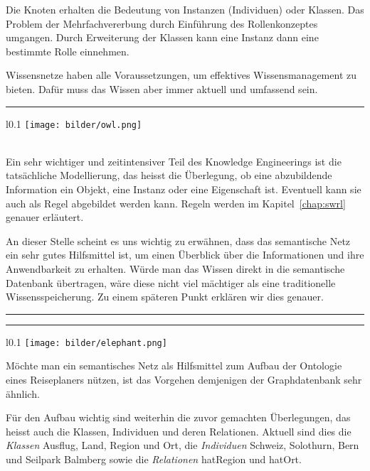 Die Knoten erhalten die Bedeutung von Instanzen (Individuen) oder Klassen. Das Problem der Mehrfachvererbung durch Einführung des Rollenkonzeptes umgangen. Durch Erweiterung der Klassen kann eine Instanz dann eine bestimmte Rolle einnehmen.

Wissensnetze haben alle Voraussetzungen, um effektives Wissensmanagement zu bieten. Dafür muss das Wissen aber immer aktuell und umfassend sein.

\newpage

\noindent\rule[1ex]{\textwidth}{1pt}
\begin{wrapfigure}[10]{l}{0.1\textwidth}
    \vspace{-2pt}
    \texttt{[image: bilder/owl.png]}
\end{wrapfigure}\\
Ein sehr wichtiger und zeitintensiver Teil des Knowledge Engineerings ist die tatsächliche Modellierung, das heisst die Überlegung, ob eine abzubildende Information ein Objekt, eine Instanz oder eine Eigenschaft ist. Eventuell kann sie auch als Regel abgebildet werden kann. Regeln werden im Kapitel~\ref{chap:swrl}  genauer erläutert.

An dieser Stelle scheint es uns wichtig zu erwähnen, dass das semantische Netz ein sehr gutes Hilfsmittel ist, um einen Überblick über die Informationen und ihre Anwendbarkeit zu erhalten. Würde man das Wissen direkt in die semantische Datenbank übertragen, wäre diese nicht viel mächtiger als eine traditionelle Wissensspeicherung. Zu einem späteren Punkt erklären wir dies genauer.

\noindent\rule[1ex]{\textwidth}{1pt}


\noindent\rule[1ex]{\textwidth}{1pt}
\begin{wrapfigure}[6]{l}{0.1\textwidth}
    \vspace{-12pt}
    \texttt{[image: bilder/elephant.png]}
\end{wrapfigure}
Möchte man ein semantisches Netz als Hilfsmittel zum Aufbau der Ontologie eines Reiseplaners nützen, ist das Vorgehen demjenigen der Graphdatenbank sehr ähnlich.

Für den Aufbau wichtig sind weiterhin die zuvor gemachten Überlegungen, das heisst auch die Klassen, Individuen und deren Relationen. Aktuell sind dies die \textit{Klassen} Ausflug, Land, Region und Ort, die \textit{Individuen} Schweiz, Solothurn, Bern und Seilpark Balmberg sowie die \textit{Relationen} hatRegion und hatOrt.

